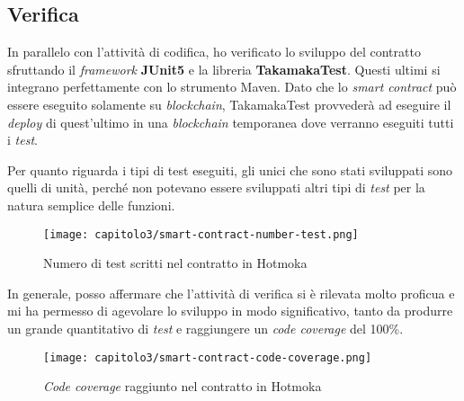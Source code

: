 \subsection{Verifica}
In parallelo con l'attività di codifica, ho verificato lo sviluppo del contratto sfruttando il \textit{framework} \textbf{JUnit5} e la libreria \textbf{TakamakaTest}. Questi ultimi si integrano perfettamente con lo strumento Maven. Dato che lo \textit{smart contract} può essere eseguito solamente su \textit{blockchain}, TakamakaTest provvederà ad eseguire il \textit{deploy} di quest'ultimo in una \textit{blockchain} temporanea dove verranno eseguiti tutti i \textit{test}. 

Per quanto riguarda i tipi di test eseguiti, gli unici che sono stati sviluppati sono quelli di unità, perché non potevano essere sviluppati altri tipi di \textit{test} per la natura semplice delle funzioni.

\begin{figure}[h!]
  \centering
  \texttt{[image: capitolo3/smart-contract-number-test.png]}
  \caption{Numero di test scritti nel contratto in Hotmoka}
\end{figure}

In generale, posso affermare che l'attività di verifica si è rilevata molto proficua e mi ha permesso di agevolare lo sviluppo in modo significativo, tanto da produrre un grande quantitativo di \textit{test} e raggiungere un \textit{code coverage} del 100\%.

\begin{figure}[h!]
  \centering
  \texttt{[image: capitolo3/smart-contract-code-coverage.png]}
  \caption{\textit{Code coverage} raggiunto nel contratto in Hotmoka}
\end{figure}
